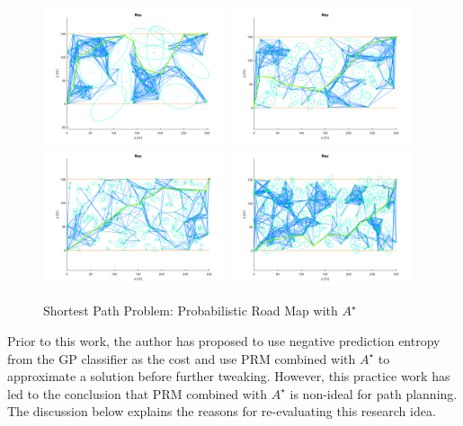 			\begin{figure}[!htbp]
				\centering
					\includegraphics[width=0.48\textwidth]{Figures/Progress/PRM/roadmap5.png}
					\includegraphics[width=0.48\textwidth]{Figures/Progress/PRM/roadmap2.png}
					\includegraphics[width=0.48\textwidth]{Figures/Progress/PRM/roadmap9.png}
					\includegraphics[width=0.48\textwidth]{Figures/Progress/PRM/roadmap10.png}
				\caption{Shortest Path Problem: Probabilistic Road Map with $A^{\star}$}
				\label{ProgressReport:PathPlanning:Figure:Roadmaps}
			\end{figure}	
					
			Prior to this work, the author has proposed to use negative prediction entropy from the GP classifier as the cost and use PRM combined with $A^{\star}$ to approximate a solution before further tweaking. However, this practice work has led to the conclusion that PRM combined with $A^{\star}$ is non-ideal for path planning. The discussion below explains the reasons for re-evaluating this research idea.
			
